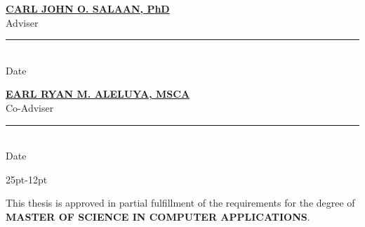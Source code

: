 \vspace{0.3cm}
\begin{center}
	\begin{minipage}{0.54\textwidth}
		\begin{center}
			\textbf{\underline{\MakeUppercase{Carl John O. Salaan}, PhD}}\\ [-0.5\baselineskip]
			Adviser\\
			\rule{2.5cm}{0.25pt}\\ [-0.5\baselineskip]
			\hspace{0.5cm} %
			Date
		\end{center}
	\end{minipage}
	\hfill
	\begin{minipage}{0.45\textwidth}
		\begin{center}
			\textbf{\underline{\MakeUppercase{Earl Ryan M. Aleluya}, MSCA}}\\ [-0.5\baselineskip]
			Co-Adviser\\
			\rule{2.5cm}{0.25pt}\\ [-0.5\baselineskip]
			\hspace{0.5cm} %
			Date
		\end{center}
	\end{minipage}
\end{center}

\begin{adjustwidth}{25pt}{-12pt}
	\begin{singlespace}
		\setlength{\marginparsep}{0pt}
		\setlength{\textwidth}{410pt}
		This thesis is approved in partial fulfillment of the requirements for the degree of \textbf{MASTER OF SCIENCE IN COMPUTER APPLICATIONS}.
	\end{singlespace}
\end{adjustwidth}


